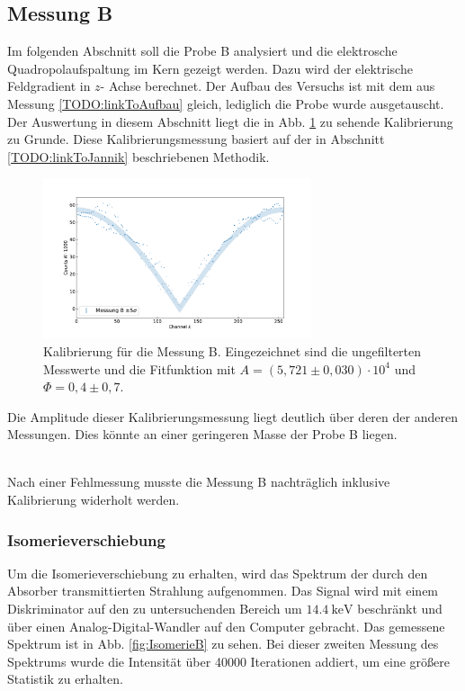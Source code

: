 \subsection{Messung B}

Im folgenden Abschnitt soll die Probe B analysiert und die elektrosche Quadropolaufspaltung im Kern gezeigt werden.
Dazu wird der elektrische Feldgradient in $z$- Achse berechnet.
Der Aufbau des Versuchs ist mit dem aus Messung \ref{TODO:linkToAufbau} gleich, lediglich die Probe wurde ausgetauscht.
Der Auswertung in diesem Abschnitt liegt die in Abb. \ref{fig:velocityB} zu sehende Kalibrierung zu Grunde.
Diese Kalibrierungsmessung basiert auf der in Abschnitt \ref{TODO:linkToJannik} beschriebenen Methodik.

\begin{figure}[ht]
	\centering
	\includegraphics[width=0.7\textwidth]{dat/velocityB.pdf}
	\caption{Kalibrierung für die Messung B. Eingezeichnet sind die ungefilterten Messwerte und die Fitfunktion mit $A = (5,721 \pm 0,030) \cdot 10^4$ und $\Phi=0,4 \pm 0,7$.}
	\label{fig:velocityB}
\end{figure}

Die Amplitude dieser Kalibrierungsmessung liegt deutlich über deren der anderen Messungen.
Dies könnte an einer geringeren Masse der Probe B liegen.

\\

Nach einer Fehlmessung musste die Messung B nachträglich inklusive Kalibrierung widerholt werden.

\subsubsection{Isomerieverschiebung}

Um die Isomerieverschiebung zu erhalten, wird das Spektrum der durch den Absorber transmittierten Strahlung aufgenommen.
Das Signal wird mit einem Diskriminator auf den zu untersuchenden Bereich um $\SI{14,4}{\kilo\electronvolt}$ beschränkt
	und über einen Analog-Digital-Wandler auf den Computer gebracht.
Das gemessene Spektrum ist in Abb. \ref{fig:IsomerieB} zu sehen.
Bei dieser zweiten Messung des Spektrums wurde die Intensität über 40000 Iterationen addiert, um eine größere Statistik zu erhalten.

